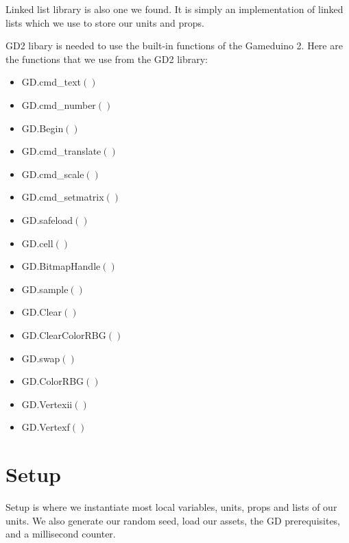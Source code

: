 Linked list library is also one we found. It is simply an implementation of linked lists which we use to store our units and props.

GD2 libary is needed to use the built-in functions of the Gameduino 2.
Here are the functions that we use from the GD2 library:
\begin{multicols}{3}
\begin{itemize}
    \item GD.cmd\_text$()$
    \item GD.cmd\_number$()$
    \item GD.Begin$()$
    \item GD.cmd\_translate$()$
    \item GD.cmd\_scale$()$
    \item GD.cmd\_setmatrix$()$
    \item GD.safeload$()$
    \item GD.cell$()$
    \item GD.BitmapHandle$()$
    \item GD.sample$()$
    \item GD.Clear$()$
    \item GD.ClearColorRBG$()$
    \item GD.swap$()$
    \item GD.ColorRBG$()$
    \item GD.Vertexii$()$
    \item GD.Vertexf$()$
\end{itemize}
\end{multicols}


\section{Setup}
Setup is where we instantiate most local variables, units, props and lists of our units. We also generate our random seed, load our assets, the GD prerequisites, and a millisecond counter.

